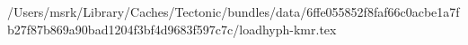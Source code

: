 /Users/msrk/Library/Caches/Tectonic/bundles/data/6ffe055852f8faf66c0acbe1a7fb27f87b869a90bad1204f3bf4d9683f597c7c/loadhyph-kmr.tex